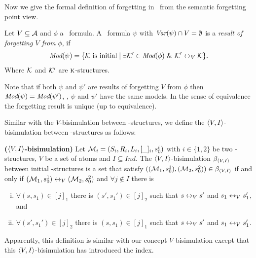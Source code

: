 \documentclass[letterpaper]{article} %
\begin{document}
Now we give the formal definition of forgetting in \CTL\ from the semantic forgetting point view.
\begin{definition}[Forgetting]\label{def:V:forgetting}
  Let $V\subseteq\cal A$ and $\phi$ a \CTL\ formula.
A \CTL\ formula $\psi$ with $\textit{Var}(\psi)\cap V=\emptyset$
is a {\em result of forgetting $V$ from} $\phi$, if
\begin{equation}
  \textit{Mod}(\psi)=\{{\cal K}\mbox{ is initial}\mid \exists {\cal K}'\in\textit{Mod}(\phi)\ \&\ {\cal K}'\leftrightarrow_V{\cal K}\}.
\end{equation}
Where $\cal K$ and ${\cal K}'$ are $\textsc{k}$-structures.
\end{definition}
Note that if both $\psi$ and $\psi'$ are results of forgetting $V$ from $\phi$ then
$\textit{Mod}(\psi)=\textit{Mod}(\psi')$, \ie, $\psi$ and $\psi'$ have the same models. In the sense
of equivalence the forgetting result is unique (up to equivalence).


Similar with the $V$-bisimulation between \MPK-structures, we define the ${\langle{V,I}\rangle}$-bisimulation between \Ind-structures as follows:
\begin{definition}\label{def:VInd:bisimulation}
\textbf{(${\langle{V,I}\rangle}$-bisimulation)}
Let ${\cal M}_i=(S_i, R_i, L_i, [\_]_i, s_0^i)$ with $i\in \{1, 2\}$ be two \Ind-structures, $V$ be a set of atoms and $I \subseteq Ind$. The ${\langle{V,I}\rangle}$-bisimulation $\beta_{{\langle{V,I}\rangle}}$ between initial \Ind-structures is a set that satisfy $(({\cal M}_1, s_0^1), ({\cal M}_2, s_0^2)) \in \beta_{{\langle{V,I}\rangle}}$  if and only if $({\cal M}_1, s_0^1) \leftrightarrow_V ({\cal M}_2, s_0^2)$ and $\forall j \notin I$ there is
\begin{enumerate}[(i)]
  \item $\forall (s, s_1)\in [j]_1$ there is $(s',s_1')\in [j]_2$ such that $s\leftrightarrow_V s'$ and $s_1 \leftrightarrow_V s_1'$, and
  \item $\forall (s', s_1')\in [j]_2$ there is $(s,s_1)\in [j]_1$ such that $s\leftrightarrow_V s'$ and $s_1 \leftrightarrow_V s_1'$.
\end{enumerate}
\end{definition}
Apparently, this definition is similar with our concept $V$-bisimulation except that this ${\langle{V,I}\rangle}$-bisimulation has introduced the index.
\end{document}
